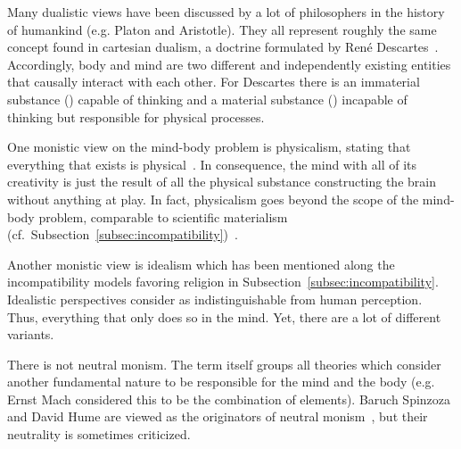Many dualistic views have been discussed by a lot of philosophers in the history of humankind (e.g. Platon and Aristotle).
They all represent roughly the same concept found in cartesian dualism, a doctrine formulated by René Descartes~\cite{Leach2017}.
Accordingly, body and mind are two different and independently existing entities that causally interact with each other.
For Descartes there is an immaterial substance () capable of thinking and a material substance () incapable of thinking but responsible for physical processes.


One monistic view on the mind-body problem is physicalism, stating that everything that exists is physical~\cite{stoljar2010physicalism}. In consequence, the mind with all of its creativity is just the result of all the physical substance constructing the brain without anything  at play.
In fact, physicalism goes beyond the scope of the mind-body problem, comparable to scientific materialism (cf.~Subsection~\ref{subsec:incompatibility})~\cite{Crane1990}.

Another monistic view is idealism which has been mentioned along the incompatibility models favoring religion in Subsection~\ref{subsec:incompatibility}.
Idealistic perspectives consider  as indistinguishable from human perception.
Thus, everything that  only does so in the mind.
Yet, there are a lot of different variants.

There is not  neutral monism. The term itself groups all theories which consider another fundamental nature to be responsible for the mind and the body (e.g. Ernst Mach considered this to be the combination of elements).
Baruch Spinzoza and David Hume are viewed as the originators of neutral monism~\cite{rosenkrantz2010historical}, but their neutrality is sometimes criticized.

